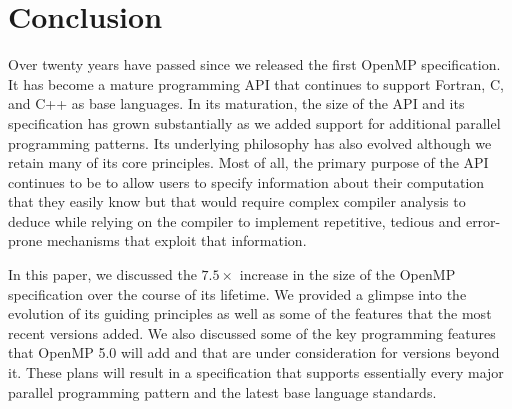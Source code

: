 \section{Conclusion}
\label{sec:conclusion}

Over twenty years have passed since we released the first OpenMP 
specification. It has become a mature programming API that 
continues to support Fortran, C, and C++ as base languages. In its
maturation, the size of the API and its specification has grown 
substantially as we added support for additional parallel programming
patterns. Its underlying philosophy has also evolved although we 
retain many of its core principles. Most of all, the primary purpose 
of the API continues to be to allow users to specify information about
their computation that they easily know but that would require complex
compiler analysis to deduce while relying on the compiler
to implement repetitive, tedious and error-prone mechanisms that
exploit that information.

In this paper, we discussed the $7.5\times$ increase in the size of the 
OpenMP specification over the course of its lifetime. We provided 
a glimpse into the evolution of its guiding principles as well as
some of the features that the most recent versions added. We also
discussed some of the key programming features that OpenMP 5.0 will
add and that are under consideration for versions beyond it. These
plans will result in a specification that supports essentially every 
major parallel programming pattern and the latest base language standards.


